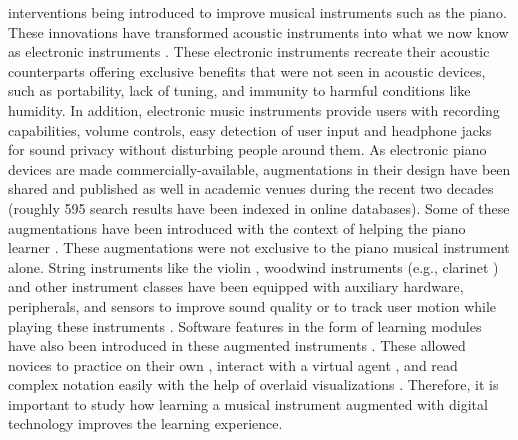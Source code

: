 \documentclass[sigconf, screen, review]{acmart}
\let\xtodo\todo
\renewcommand{\todo}[1]{\xtodo[inline]{#1}}
\newcommand{\todoj}[1]{\xtodo[inline,color=orange!50]{Jordan: #1}}
\begin{document}
interventions being introduced to improve musical instruments such as the piano. These innovations have transformed acoustic instruments into what we now know as electronic instruments \cite{magnusson2007acoustic}. These electronic instruments recreate their acoustic counterparts offering exclusive benefits that were not seen in acoustic devices, such as portability, lack of tuning, and immunity to harmful conditions like humidity. In addition, electronic music instruments provide users with recording capabilities, volume controls, easy detection of user input and headphone jacks for sound privacy without disturbing people around them.
As electronic piano devices are made commercially-available, augmentations in their design have been shared and published  as well in academic venues during the recent two decades (roughly 595 search results have been indexed in online databases). Some of these augmentations have been introduced with the context of helping the piano learner \cite{mcpherson2010augmenting}. These augmentations were not exclusive to the piano musical instrument alone.  String instruments like the violin \cite{overholt2005overtone}, woodwind instruments (e.g., clarinet \cite{silva2008interaction}) and other instrument classes \cite{turchet2018some, newton2011examining} have been equipped with auxiliary hardware, peripherals, and sensors to improve sound quality \cite{mcpherson2011multidimensional} or to track user motion while playing these instruments \cite{hadjakos2012pianist}. Software features in the form of learning modules have also been introduced in these augmented instruments \cite{barakonyi2005augmented, xiao2011duet, raymaekers2014game}. These allowed novices to practice on their own \cite{fober2007vemus}, interact with a virtual agent \cite{costalonga2008agent, tidemann2009groovy}, and read complex notation easily with the help of overlaid visualizations \cite{trujano2018arpiano, gerry2019adept, santiniaugmented}. Therefore, it is important to study how learning a musical instrument augmented with digital technology improves the learning experience. %
\todoj{this part is hanging}
\end{document}
